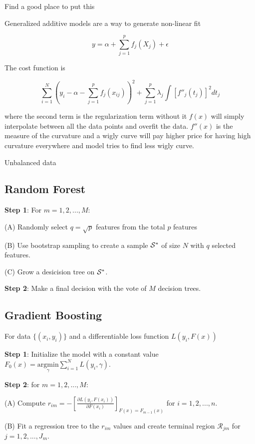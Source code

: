 \documentclass[11pt]{article}
\theoremstyle{definition}
\begin{document}
Find a good place to put this

Generalized additive models are a way to generate non-linear fit 

$$
y = \alpha + \sum_{j=1}^p f_j(X_j) + \epsilon
$$

The cost function is 


$$
\sum_{i=1}^N \left( y_i - \alpha - \sum_{j=1}^p f_j(x_{ij}) \right)^2 + \sum_{j=1}^p \lambda_j \int [f''_j (t_j)]^2 dt_j
$$


where the second term is the regularization term without it $f(x)$ will simply interpolate between all the data points and overfit the data. $f''(x)$ is the measure of the curvature and a wigly curve will pay higher price for having high curvature everywhere and model tries to find less wigly curve. 



Unbalanced data 

\subsection{Random Forest }


{\bf{Step 1}}: For $m = 1, 2, ..., M$:

\quad	(A) Randomly select $q = \sqrt{p}$ features from the total $p$ features 

\quad	(B) Use bootstrap sampling to create a sample $\cal{S}^*$ of size $N$ with $q$ selected features. 

\quad	(C) Grow a desicision tree on $\cal{S}^*$. 

{\bf{Step 2}}:  Make a final decision with the vote of $M$ decision trees. 


\subsection{Gradient Boosting }

For data $\{(x_i, y_i)\}$ and a differentiable loss function $L(y_i, F(x))$

{\bf{Step 1}}:  Initialize the model with a constant value $F_0(x) = \underset{\gamma}{\mathrm{argmin}} \sum_{i=1}^N L(y_i, \gamma)$. 

{\bf{Step 2}}:  for $m=1, 2, ... , M$:

\quad	(A) Compute $r_{im} = -\left[\frac{\partial L(y_i, F(x_i))}{\partial F(x_i)} \right]_{F(x) = F_{m-1}(x)}$ for $i = 1, 2, ..., n$. 

\quad	(B) Fit a regression tree to the $r_{im}$ values and create terminal region $\mathcal{R}_{jm}$ for $j = 1, 2, ..., J_m$. 
\end{document}
